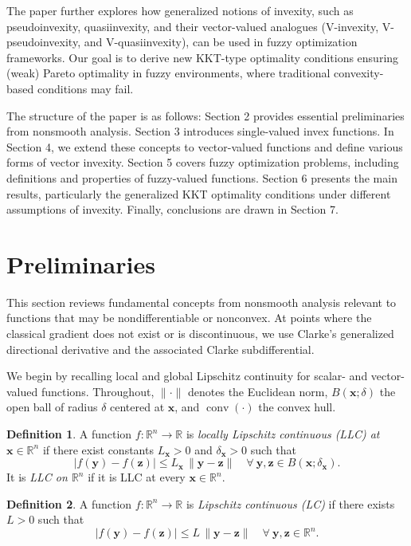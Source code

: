 \documentclass{article}
\theoremstyle{definition}
\newtheorem{maar}{Definition}[section]
\begin{document}
The paper further explores how generalized notions of invexity, such as pseudoinvexity, quasiinvexity, and their vector-valued analogues (V-invexity, V-pseudoinvexity, and V-quasiinvexity), can be used in fuzzy optimization frameworks. Our goal is to derive new KKT-type optimality conditions ensuring (weak) Pareto optimality in fuzzy environments, where traditional convexity-based conditions may fail.

The structure of the paper is as follows: Section 2 provides essential preliminaries from nonsmooth analysis. Section 3 introduces single-valued invex functions. In Section 4, we extend these concepts to vector-valued functions and define various forms of vector invexity. Section 5 covers fuzzy optimization problems, including definitions and properties of fuzzy-valued functions. Section 6 presents the main results, particularly the generalized KKT optimality conditions under different assumptions of invexity. Finally, conclusions are drawn in Section 7.


\section{Preliminaries}
This section reviews fundamental concepts from nonsmooth analysis relevant to functions that may be nondifferentiable or nonconvex. At points where the classical gradient does not exist or is discontinuous, we use Clarke’s generalized directional derivative and the associated Clarke subdifferential.

We begin by recalling local and global Lipschitz continuity for scalar- and vector-valued functions. Throughout, $\| \cdot \|$ denotes the Euclidean norm, $B(\boldsymbol{x}; \delta)$ the open ball of radius $\delta$ centered at $\boldsymbol{x}$, and $\operatorname{conv}(\cdot)$ the convex hull.

\begin{maar}\cite{BaKaMa}\label{def:LLC}
A function $f:\mathbb{R}^{n}\to\mathbb{R}$ is \emph{locally Lipschitz continuous (LLC) at} $\boldsymbol x\in\mathbb{R}^{n}$ if there exist constants $L_{\boldsymbol x}>0$ and $\delta_{\boldsymbol x}>0$ such that  
\[
  |f(\boldsymbol y)-f(\boldsymbol z)| \le L_{\boldsymbol x}\,\|\boldsymbol y-\boldsymbol z\|
  \quad\forall\ \boldsymbol y,\boldsymbol z\in B(\boldsymbol x;\delta_{\boldsymbol x}).
\]
It is \emph{LLC on $\mathbb{R}^{n}$} if it is LLC at every $\boldsymbol x\in\mathbb{R}^{n}$.
\end{maar}

\begin{maar}\cite{BaKaMa}\label{def:LC}
A function $f:\mathbb{R}^{n}\to\mathbb{R}$ is \emph{Lipschitz continuous (LC)} if there exists $L>0$ such that
\[
  |f(\boldsymbol y)-f(\boldsymbol z)| \le L\,\|\boldsymbol y-\boldsymbol z\|
  \quad\forall\ \boldsymbol y,\boldsymbol z\in\mathbb{R}^{n}.
\]
\end{maar}
\end{document}
